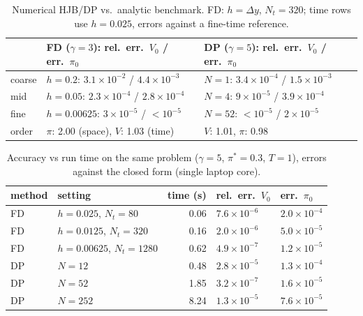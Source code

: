 \documentclass[10pt,a4paper]{article}
\begin{document}
\begin{table}[!htb]\centering\footnotesize\caption{Numerical HJB/DP vs.\ analytic benchmark. FD: $h=\Delta y$, $N_t=320$; time rows use $h=0.025$, errors against a fine-time reference.}
\begin{tabular}{lll}\toprule
 & FD ($\gamma{=}3$): rel.\ err.\ $V_0$ / err.\ $\pi_0$ & DP ($\gamma{=}5$): rel.\ err.\ $V_0$ / err.\ $\pi_0$\\\midrule
coarse & $h{=}0.2$: $3.1\!\times\!10^{-2}$ / $4.4\!\times\!10^{-3}$ & $N{=}1$: $3.4\!\times\!10^{-4}$ / $1.5\!\times\!10^{-3}$\\
mid & $h{=}0.05$: $2.3\!\times\!10^{-4}$ / $2.8\!\times\!10^{-4}$ & $N{=}4$: $9\!\times\!10^{-5}$ / $3.9\!\times\!10^{-4}$\\
fine & $h{=}0.00625$: $3\!\times\!10^{-5}$ / $<10^{-5}$ & $N{=}52$: $<10^{-5}$ / $2\!\times\!10^{-5}$\\
order & $\pi$: 2.00 (space), $V$: 1.03 (time) & $V$: 1.01, $\pi$: 0.98\\\bottomrule\end{tabular}\end{table}
\begin{table}[!htb]\centering\footnotesize\caption{Accuracy vs run time on the same problem ($\gamma{=}5$, $\pi^*{=}0.3$, $T{=}1$), errors against the closed form (single laptop core).}
\begin{tabular}{llrll}\toprule
method & setting & time (s) & rel.\ err.\ $V_0$ & err.\ $\pi_0$\\\midrule
FD & $h{=}0.025$, $N_t{=}80$ & 0.06 & $7.6\!\times\!10^{-6}$ & $2.0\!\times\!10^{-4}$\\
FD & $h{=}0.0125$, $N_t{=}320$ & 0.16 & $2.0\!\times\!10^{-6}$ & $5.0\!\times\!10^{-5}$\\
FD & $h{=}0.00625$, $N_t{=}1280$ & 0.62 & $4.9\!\times\!10^{-7}$ & $1.2\!\times\!10^{-5}$\\
DP & $N{=}12$ & 0.48 & $2.8\!\times\!10^{-5}$ & $1.3\!\times\!10^{-4}$\\
DP & $N{=}52$ & 1.85 & $3.2\!\times\!10^{-7}$ & $1.6\!\times\!10^{-5}$\\
DP & $N{=}252$ & 8.24 & $1.3\!\times\!10^{-5}$ & $7.6\!\times\!10^{-5}$\\\bottomrule\end{tabular}\end{table}
\end{document}

